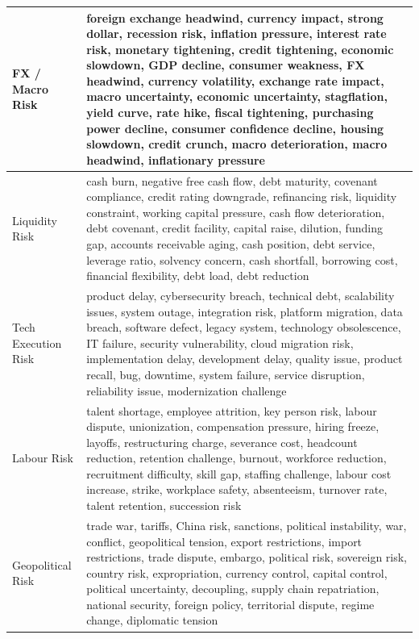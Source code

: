 \documentclass[12pt,a4paper]{article}
\begin{document}
\begin{longtable}{@{}lp{11cm}@{}}
\midrule
FX / Macro Risk & foreign exchange headwind, currency impact, strong dollar, recession risk, inflation pressure, interest rate risk, monetary tightening, credit tightening, economic slowdown, GDP decline, consumer weakness, FX headwind, currency volatility, exchange rate impact, macro uncertainty, economic uncertainty, stagflation, yield curve, rate hike, fiscal tightening, purchasing power decline, consumer confidence decline, housing slowdown, credit crunch, macro deterioration, macro headwind, inflationary pressure \\
\midrule
Liquidity Risk & cash burn, negative free cash flow, debt maturity, covenant compliance, credit rating downgrade, refinancing risk, liquidity constraint, working capital pressure, cash flow deterioration, debt covenant, credit facility, capital raise, dilution, funding gap, accounts receivable aging, cash position, debt service, leverage ratio, solvency concern, cash shortfall, borrowing cost, financial flexibility, debt load, debt reduction \\
\midrule
Tech Execution Risk & product delay, cybersecurity breach, technical debt, scalability issues, system outage, integration risk, platform migration, data breach, software defect, legacy system, technology obsolescence, IT failure, security vulnerability, cloud migration risk, implementation delay, development delay, quality issue, product recall, bug, downtime, system failure, service disruption, reliability issue, modernization challenge \\
\midrule
Labour Risk & talent shortage, employee attrition, key person risk, labour dispute, unionization, compensation pressure, hiring freeze, layoffs, restructuring charge, severance cost, headcount reduction, retention challenge, burnout, workforce reduction, recruitment difficulty, skill gap, staffing challenge, labour cost increase, strike, workplace safety, absenteeism, turnover rate, talent retention, succession risk \\
\midrule
Geopolitical Risk & trade war, tariffs, China risk, sanctions, political instability, war, conflict, geopolitical tension, export restrictions, import restrictions, trade dispute, embargo, political risk, sovereign risk, country risk, expropriation, currency control, capital control, political uncertainty, decoupling, supply chain repatriation, national security, foreign policy, territorial dispute, regime change, diplomatic tension \\
\bottomrule
\end{longtable}
\end{document}
